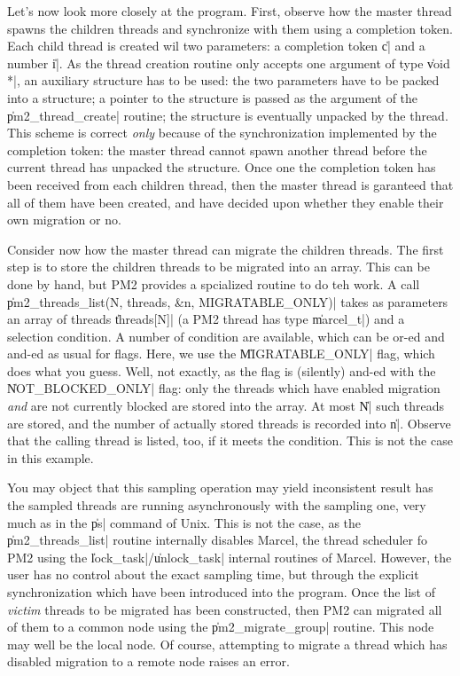 Let's now look more closely at the program. First, observe how the
master thread spawns the children threads and synchronize with them
using a completion token. Each child thread is created wil two
parameters: a completion token \|c| and a number \|i|. As the thread
creation routine only accepts one argument of type \|void *|, an
auxiliary structure has to be used: the two parameters have to be
packed into a structure; a pointer to the structure is passed as the
argument of the \|pm2_thread_create| routine; the structure is
eventually unpacked by the thread. This scheme is correct \emph{only}
because of the synchronization implemented by the completion token:
the master thread cannot spawn another thread before the current
thread has unpacked the structure.  Once one the completion token has
been received from each children thread, then the master thread is
garanteed that all of them have been created, and have decided upon
whether they enable their own migration or no.

Consider now how the master thread can migrate the children threads.
The first step is to store the children threads to be migrated into an
array.  This can be done by hand, but PM2 provides a spcialized
routine to do teh work. A call \|pm2_threads_list(N, threads, &n,
MIGRATABLE_ONLY)| takes as parameters an array of threads
\|threads[N]| (a PM2 thread has type \|marcel_t|) and a selection
condition. A number of condition are available, which can be or-ed and
and-ed as usual for flags. Here, we use the \|MIGRATABLE_ONLY| flag,
which does what you guess. Well, not exactly, as the flag is
(silently) and-ed with the \|NOT_BLOCKED_ONLY| flag: only the threads
which have enabled migration \emph{and} are not currently blocked are
stored into the array. At most \|N| such threads are stored, and the
number of actually stored threads is recorded into \|n|. Observe that
the calling thread is listed, too, if it meets the condition. This is
not the case in this example.

You may object that this sampling operation may yield inconsistent
result has the sampled threads are running asynchronously with the
sampling one, very much as in the \|ps| command of Unix. This is not
the case, as the \|pm2_threads_list| routine internally disables
Marcel, the thread scheduler fo PM2 using the
\|lock_task|/\|unlock_task| internal routines of Marcel. However, the
user has no control about the exact sampling time, but through the
explicit synchronization which have been introduced into the program.
Once the list of \emph{victim} threads to be migrated has been
constructed, then PM2 can migrated all of them to a common node using
the \|pm2_migrate_group| routine. This node may well be the local
node.  Of course, attempting to migrate a thread which has disabled
migration to a remote node raises an error.

